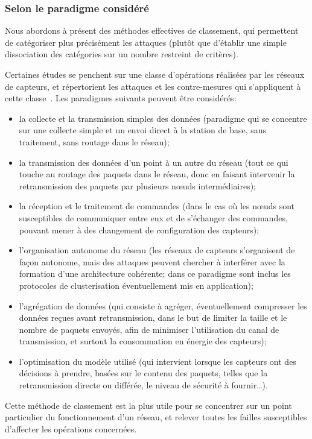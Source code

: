 \subsubsection{Selon le paradigme considéré}\label{ea:sss:paradigm}
Nous abordons à présent des méthodes effectives de classement, qui permettent de catégoriser plus précisément les attaques (plutôt que d'établir une simple dissociation des catégories sur un nombre restreint de critères).

Certaines études se penchent sur une classe d'opérations réalisées par les réseaux de capteurs, et répertorient les attaques et les contre-mesures qui s'appliquent à cette classe~\cite{JPD06,OX09}.
Les paradigmes suivants peuvent être considérés:
\begin{itemize}
    \item la collecte et la transmission simples des données (paradigme qui se concentre sur une collecte simple et un envoi direct à la station de base, sans traitement, sans routage dans le réseau);
    \item la transmission des données d'un point à un autre du réseau (\cad tout ce qui touche au routage des paquets dans le réseau, donc en faisant intervenir la retransmission des paquets par plusieurs nœuds intermédiaires);
    \item la réception et le traitement de commandes (dans le cas où les nœuds sont susceptibles de communiquer entre eux et de s'échanger des commandes, pouvant mener à des changement de configuration des capteurs);
    \item l'organisation autonome du réseau (les réseaux de capteurs s'organisent de façon autonome, mais des attaques peuvent chercher à interférer avec la formation d'une architecture cohérente; dans ce paradigme sont inclus les protocoles de clusterisation éventuellement mis en application);
    \item l'agrégation de données (qui consiste à agréger, éventuellement compresser les données reçues avant retransmission, dans le but de limiter la taille et le nombre de paquets envoyés, afin de minimiser l'utilisation du canal de transmission, et surtout la consommation en énergie des capteurs);
    \item l'optimisation du modèle utilisé (qui intervient lorsque les capteurs ont des décisions à prendre, basées sur le contenu des paquets, telles que la retransmission directe ou différée, le niveau de sécurité à fournir\dots).
\end{itemize}
Cette méthode de classement est la plus utile pour se concentrer sur un point particulier du fonctionnement d'un réseau, et relever toutes les failles susceptibles d'affecter les opérations concernées.

